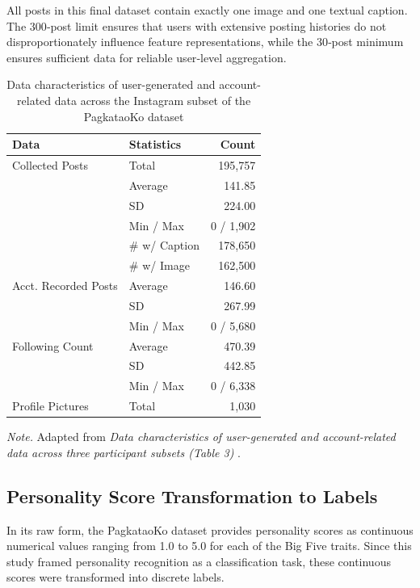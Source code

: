 All posts in this final dataset contain exactly one image and one textual caption. The 300‑post limit ensures that users with extensive posting histories do not disproportionately influence feature representations, while the 30‑post minimum ensures sufficient data for reliable user‑level aggregation.

\begin{table}[h!]
\centering
\caption{Data characteristics of user-generated and account-related data across the Instagram subset of the PagkataoKo dataset}
\label{tab:pagkataoko_data_characteristics}
\begin{tabular}{@{}llr@{}}
\toprule
\textbf{Data} & \textbf{Statistics} & \textbf{Count} \\ 
\midrule
    {Collected Posts} & Total & 195,757 \\
    & Average & 141.85 \\
    & SD & 224.00 \\
    & Min / Max & 0 / 1,902 \\
    & \# w/ Caption & 178,650 \\
    & \# w/ Image & 162,500 \\
\midrule
    {Acct. Recorded Posts} & Average & 146.60 \\
    & SD & 267.99 \\
    & Min / Max & 0 / 5,680 \\
\midrule
    {Following Count} & Average & 470.39 \\
    & SD & 442.85 \\
    & Min / Max & 0 / 6,338 \\
\midrule
Profile Pictures & Total & 1,030 \\
\bottomrule
\end{tabular}
\begin{minipage}{\linewidth}
\small\textit{Note.} Adapted from \textit{Data characteristics of user-generated and account-related data across three participant subsets (Table 3)} \citep{tighe_acorda_2022}.
\end{minipage}
\end{table}


\subsection{Personality Score Transformation to Labels}
In its raw form, the PagkataoKo dataset provides personality scores as continuous numerical values ranging from 1.0 to 5.0 for each of the Big Five traits. Since this study framed personality recognition as a classification task, these continuous scores were transformed into discrete labels.

